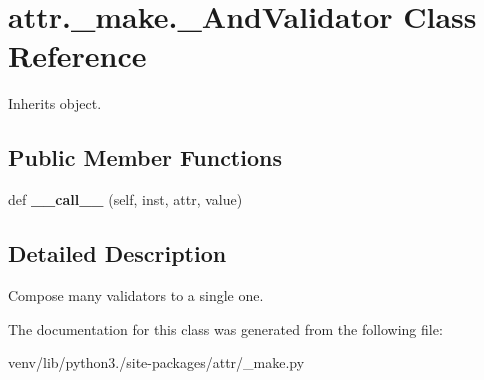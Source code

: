 \hypertarget{classattr_1_1__make_1_1___and_validator}{}\section{attr.\+\_\+make.\+\_\+\+And\+Validator Class Reference}
\label{classattr_1_1__make_1_1___and_validator}


Inherits object.

\subsection*{Public Member Functions}
\begin{DoxyCompactItemize}
\item 
\mbox{\label{classattr_1_1__make_1_1___and_validator_a06227463dd4ab745e5f8781a2e19a2e1}} 
def {\bfseries \+\_\+\+\_\+call\+\_\+\+\_\+} (self, inst, attr, value)
\end{DoxyCompactItemize}


\subsection{Detailed Description}
\begin{DoxyVerb}Compose many validators to a single one.
\end{DoxyVerb}
 

The documentation for this class was generated from the following file\+:\begin{DoxyCompactItemize}
\item 
venv/lib/python3./site-\/packages/attr/\+\_\+make.\+py\end{DoxyCompactItemize}
